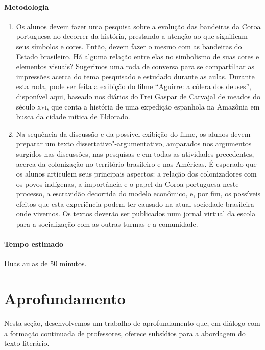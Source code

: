 \documentclass[12pt]{extarticle}
\begin{document}
{\paragraph{Metodologia}
\begin{enumerate}
\item 
Os alunos devem fazer uma pesquisa sobre a evolução das bandeiras da Coroa
portuguesa no decorrer da história, prestando a atenção ao que significam
seus símbolos e cores. Então, devem fazer o mesmo com as bandeiras do 
Estado brasileiro. Há alguma relação entre elas no simbolismo de suas
cores e elementos visuais? Sugerimos uma roda de conversa para se 
compartilhar as impressões acerca do tema pesquisado e estudado durante
as aulas. Durante esta roda, pode ser feita a exibição do filme ``Aguirre: 
a cólera dos deuses'', disponível \href{https://www.youtube.com/watch?v=weuYp-XFxAo}{aqui}, baseado nos diários do Frei Gaspar de Carvajal 
de meados do século \textsc{xvi}, que conta a história de uma expedição 
espanhola na Amazônia em busca da cidade mítica de Eldorado.

\item 
Na sequência da discussão e da possível exibição do filme, os alunos devem 
preparar um texto dissertativo"-argumentativo, amparados nos argumentos 
surgidos nas discussões, nas pesquisas e em todas as atividades 
precedentes, acerca da colonização no território brasileiro e nas Américas. 
É esperado que os alunos articulem seus principais aspectos:
a relação dos colonizadores com os povos indígenas, a importância e o papel
da Coroa portuguesa neste processo, a escravidão decorrida do modelo 
econômico, e, por fim, os possíveis efeitos que esta experiência podem 
ter causado na atual sociedade brasileira onde vivemos.
Os textos deverão ser publicados num jornal virtual da escola para a 
socialização com as outras turmas e a comunidade.

\end{enumerate}

\paragraph{Tempo estimado} Duas aulas de 50 minutos.


\section{Aprofundamento}


Nesta seção, desenvolvemos um trabalho de aprofundamento que, em diálogo
com a formação continuada de professores, oferece subsídios para a
abordagem do texto literário.

}
\end{document}
